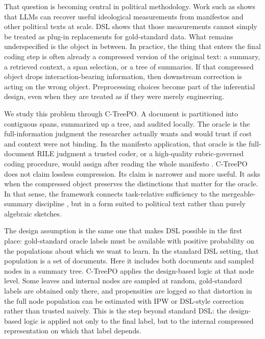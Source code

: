 \documentclass[11pt]{article}
\begin{document}
That question is becoming central in political methodology. Work such as \citet{BenoitEtAl2025} shows that LLMs can recover useful ideological measurements from manifestos and other political texts at scale. DSL shows that those measurements cannot simply be treated as plug-in replacements for gold-standard data. What remains underspecified is the object in between. In practice, the thing that enters the final coding step is often already a compressed version of the original text: a summary, a retrieved context, a span selection, or a tree of summaries. If that compressed object drops interaction-bearing information, then downstream correction is acting on the wrong object. Preprocessing choices become part of the inferential design, even when they are treated as if they were merely engineering.

We study this problem through C-TreePO. A document is partitioned into contiguous spans, summarized up a tree, and audited locally. The oracle is the full-information judgment the researcher actually wants and would trust if cost and context were not binding. In the manifesto application, that oracle is the full-document RILE judgment a trusted coder, or a high-quality rubric-governed coding procedure, would assign after reading the whole manifesto \citep{ManifestoProject2025a}. C-TreePO does not claim lossless compression. Its claim is narrower and more useful. It asks when the compressed object preserves the distinctions that matter for the oracle. In that sense, the framework connects task-relative sufficiency \citep{Blackwell1953} to the mergeable-summary discipline \citep{Agarwal2013MergeableTODS}, but in a form suited to political text rather than purely algebraic sketches.

The design assumption is the same one that makes DSL possible in the first place: gold-standard oracle labels must be available with positive probability on the populations about which we want to learn. In the standard DSL setting, that population is a set of documents. Here it includes both documents and sampled nodes in a summary tree. C-TreePO applies the design-based logic at that node level. Some leaves and internal nodes are sampled at random, gold-standard labels are obtained only there, and propensities are logged so that distortion in the full node population can be estimated with IPW or DSL-style correction rather than trusted naively. This is the step beyond standard DSL: the design-based logic is applied not only to the final label, but to the internal compressed representation on which that label depends.
\end{document}
